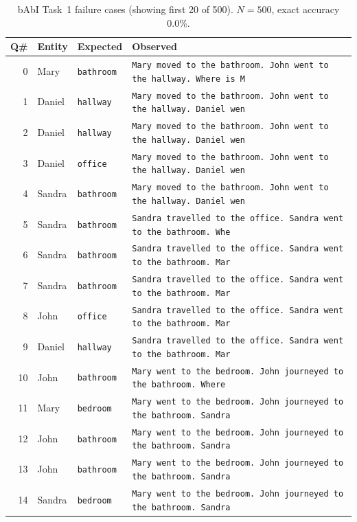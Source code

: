 \begin{table}[htbp]
  \centering
  \caption{bAbI Task~1 failure cases (showing first 20 of
    500). $N = 500$, exact accuracy
    0.0\%.}
  \label{tab:babi_failures}
  \begin{tabular}{rlll}
    \toprule
    \textbf{Q\#} & \textbf{Entity} & \textbf{Expected} & \textbf{Observed} \\
    \midrule
    0 & Mary & \texttt{bathroom} & \texttt{Mary moved to the bathroom. John went to the hallway. Where is M} \\
    1 & Daniel & \texttt{hallway} & \texttt{Mary moved to the bathroom. John went to the hallway. Daniel wen} \\
    2 & Daniel & \texttt{hallway} & \texttt{Mary moved to the bathroom. John went to the hallway. Daniel wen} \\
    3 & Daniel & \texttt{office} & \texttt{Mary moved to the bathroom. John went to the hallway. Daniel wen} \\
    4 & Sandra & \texttt{bathroom} & \texttt{Mary moved to the bathroom. John went to the hallway. Daniel wen} \\
    5 & Sandra & \texttt{bathroom} & \texttt{Sandra travelled to the office. Sandra went to the bathroom. Whe} \\
    6 & Sandra & \texttt{bathroom} & \texttt{Sandra travelled to the office. Sandra went to the bathroom. Mar} \\
    7 & Sandra & \texttt{bathroom} & \texttt{Sandra travelled to the office. Sandra went to the bathroom. Mar} \\
    8 & John & \texttt{office} & \texttt{Sandra travelled to the office. Sandra went to the bathroom. Mar} \\
    9 & Daniel & \texttt{hallway} & \texttt{Sandra travelled to the office. Sandra went to the bathroom. Mar} \\
    10 & John & \texttt{bathroom} & \texttt{Mary went to the bedroom. John journeyed to the bathroom. Where} \\
    11 & Mary & \texttt{bedroom} & \texttt{Mary went to the bedroom. John journeyed to the bathroom. Sandra} \\
    12 & John & \texttt{bathroom} & \texttt{Mary went to the bedroom. John journeyed to the bathroom. Sandra} \\
    13 & John & \texttt{bathroom} & \texttt{Mary went to the bedroom. John journeyed to the bathroom. Sandra} \\
    14 & Sandra & \texttt{bedroom} & \texttt{Mary went to the bedroom. John journeyed to the bathroom. Sandra} \\

\end{tabular}
\end{table}

